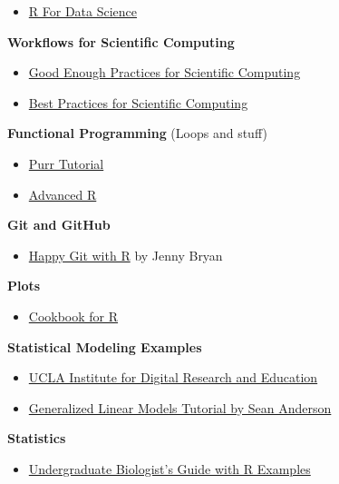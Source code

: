 \documentclass[]{book}
\providecommand{\tightlist}{%
  \setlength{\itemsep}{0pt}\setlength{\parskip}{0pt}}
\begin{document}
\begin{itemize}
\tightlist
\item
  \href{http://r4ds.had.co.nz/}{R For Data Science}
\end{itemize}

\textbf{Workflows for Scientific Computing}

\begin{itemize}
\tightlist
\item
  \href{http://journals.plos.org/ploscompbiol/article?id=10.1371/journal.pcbi.1005510}{Good
  Enough Practices for Scientific Computing}
\item
  \href{http://journals.plos.org/plosbiology/article?id=10.1371/journal.pbio.1001745}{Best
  Practices for Scientific Computing}
\end{itemize}

\textbf{Functional Programming} (Loops and stuff)

\begin{itemize}
\tightlist
\item
  \href{http://ctlente.com/en/purrr-magic/}{Purr Tutorial}
\item
  \href{\%22http://adv-r.had.co.nz/\%22}{Advanced R}
\end{itemize}

\textbf{Git and GitHub}

\begin{itemize}
\tightlist
\item
  \href{http://happygitwithr.com/}{Happy Git with R} by Jenny Bryan
\end{itemize}

\textbf{Plots}

\begin{itemize}
\tightlist
\item
  \href{http://www.cookbook-r.com/Graphs/}{Cookbook for R}
\end{itemize}

\textbf{Statistical Modeling Examples}

\begin{itemize}
\tightlist
\item
  \href{https://stats.idre.ucla.edu/}{UCLA Institute for Digital
  Research and Education}
\item
  \href{https://github.com/seananderson/glmm-course}{Generalized Linear
  Models Tutorial by Sean Anderson}
\end{itemize}

\textbf{Statistics}

\begin{itemize}
\tightlist
\item
  \href{https://sunsetridgemsbiology.wikispaces.com/file/view/Choosing+and+Using+Statistics.pdf}{Undergraduate
  Biologist's Guide with R Examples}
\end{itemize}
\end{document}
